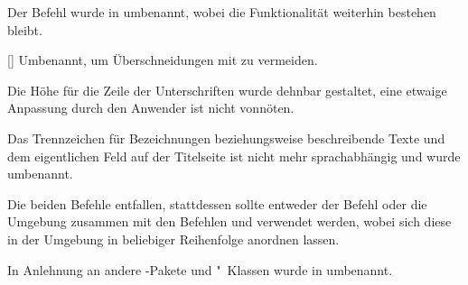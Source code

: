 \begin{Declaration}[v2.00]{}
%
Der Befehl  wurde in  umbenannt, wobei die 
Funktionalität weiterhin bestehen bleibt.
\end{Declaration}

\begin{Declaration}[v2.00]{[\PBoolean]}
%
Umbenannt, um Überschneidungen mit  zu vermeiden.
\end{Declaration}

\begin{Declaration}[v2.00]{}
%
Die Höhe für die Zeile der Unterschriften wurde dehnbar gestaltet, eine etwaige 
Anpassung durch den Anwender ist nicht vonnöten.
\end{Declaration}

\begin{Declaration}[v2.00]{}%
%
Das Trennzeichen für Bezeichnungen beziehungsweise beschreibende Texte und dem 
eigentlichen Feld auf der Titelseite ist nicht mehr sprachabhängig und wurde 
umbenannt.
\end{Declaration}

\begin{Declaration}[v2.00]{}
\begin{Declaration}[v2.00]{}
%
Die beiden Befehle entfallen, stattdessen sollte entweder der Befehl 
 oder die Umgebung  zusammen mit 
den Befehlen  und  verwendet werden, 
wobei sich diese in der Umgebung in beliebiger Reihenfolge anordnen lassen.
\end{Declaration}
\end{Declaration}

\begin{Declaration}[v2.00]{}{%
}
\printdeclarationlist*%
In Anlehnung an andere -Pakete und "~Klassen wurde 
 in  umbenannt.
\end{Declaration}

